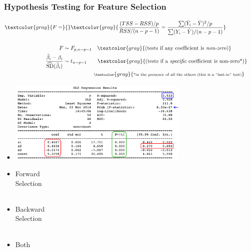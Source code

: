 \documentclass[xcolor={dvipsnames}]{beamer}
\begin{document}
\frame
{
 \frametitle{Hypothesis Testing for Feature Selection}

\vspace{-1em}
\begin{align*}
\textcolor{gray}{F =} {}& \textcolor{gray}{\frac{(TSS - RSS)/p}{RSS/(n-p-1)} = \frac{\sum(\hat Y_i -\bar Y )^2/p}{\sum( Y_i -\hat Y )/(n-p-1)}} \\{}\\
F \sim  {}& F_{p,n-p-1} \quad \textcolor{gray}{\text{(tests if any coefficient is \emph{non-zero})}} \\ 
\frac{\hat \beta_i - \beta_i}{\widehat{\text{SD}}(\hat \beta_i)} \sim  {} & t_{n-p-1} \quad\quad \textcolor{gray}{\text{(tests if a \emph{specific} coefficient is non-zero*)}}\\
{} &\;\quad\quad\quad\quad \scriptsize \textcolor{gray}{\text{*in the presence of all the others (this is a ``last-in'' test)}}\\
\end{align*}

\vspace{-.6in}
\begin{itemize}
\item<2->[]
\hspace*{.75in}\includegraphics[width=3.5in]{stuff/regtable.png} 
\vspace{-1.6in}
\item<3-> Forward \\Selection\\${}$\\
\item<4-> Backward \\Selection\\${}$\\
\item<5-> Both \\${}$\\
\end{itemize}


}
\end{document}
